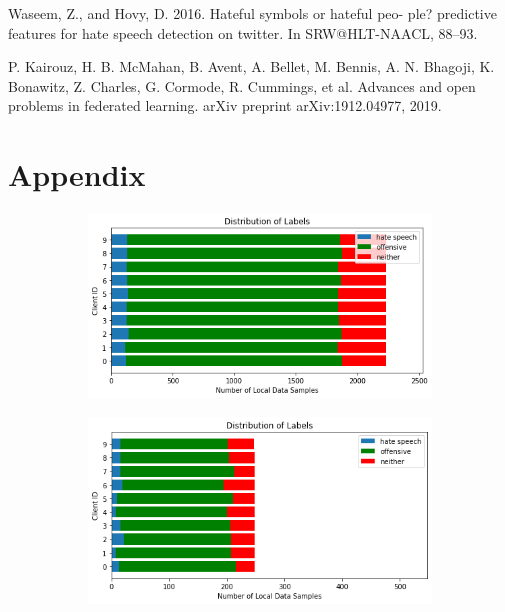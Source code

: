 \documentclass[letterpaper]{article} %
\begin{document}
Waseem, Z., and Hovy, D. 2016. Hateful symbols or hateful peo-
ple? predictive features for hate speech detection on twitter. In
SRW@HLT-NAACL, 88–93.

P. Kairouz, H. B. McMahan, B. Avent, A. Bellet, M. Bennis, A. N.
Bhagoji, K. Bonawitz, Z. Charles, G. Cormode, R. Cummings, et al.
Advances and open problems in federated learning. arXiv preprint
arXiv:1912.04977, 2019.
\clearpage
\section{Appendix}

\begin{figure}[hbt!]

\begin{subfigure}{\columnwidth}
{\includegraphics[width=\columnwidth]{iid_distribution_of_labels_7}}
\caption{}
\end{subfigure}%

\begin{subfigure}{\columnwidth}
{\includegraphics[width=\columnwidth]{iid_test_set_distribution_of_labels_7}}
\caption{}
\end{subfigure}

\caption{}
\end{figure}
\end{document}
